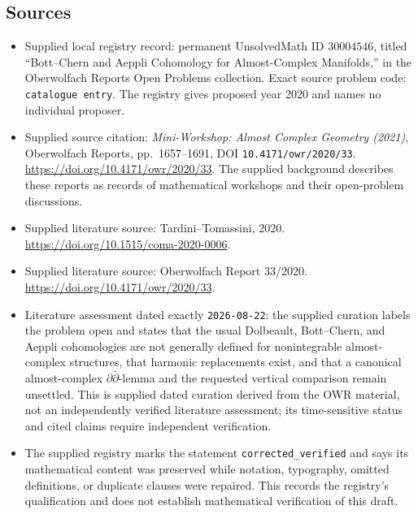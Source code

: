 \documentclass[11pt]{article}
\begin{document}
\subsection{Sources}
\begin{itemize}
\item Supplied local registry record: permanent UnsolvedMath ID \(30004546\), titled ``Bott--Chern and Aeppli Cohomology for Almost-Complex Manifolds,'' in the Oberwolfach Reports Open Problems collection. Exact source problem code: \texttt{catalogue entry}. The registry gives proposed year 2020 and names no individual proposer.
\item Supplied source citation: \emph{Mini-Workshop: Almost Complex Geometry (2021)}, Oberwolfach Reports, pp.~1657--1691, DOI \texttt{10.4171/owr/2020/33}. \url{https://doi.org/10.4171/owr/2020/33}. The supplied background describes these reports as records of mathematical workshops and their open-problem discussions.
\item Supplied literature source: Tardini--Tomassini, 2020. \url{https://doi.org/10.1515/coma-2020-0006}.
\item Supplied literature source: Oberwolfach Report 33/2020. \url{https://doi.org/10.4171/owr/2020/33}.
\item Literature assessment dated exactly \texttt{2026-08-22}: the supplied curation labels the problem open and states that the usual Dolbeault, Bott--Chern, and Aeppli cohomologies are not generally defined for nonintegrable almost-complex structures, that harmonic replacements exist, and that a canonical almost-complex \(\partial\bar\partial\)-lemma and the requested vertical comparison remain unsettled. This is supplied dated curation derived from the OWR material, not an independently verified literature assessment; its time-sensitive status and cited claims require independent verification.
\item The supplied registry marks the statement \texttt{corrected\_verified} and says its mathematical content was preserved while notation, typography, omitted definitions, or duplicate clauses were repaired. This records the registry's qualification and does not establish mathematical verification of this draft.
\end{itemize}
\end{document}
